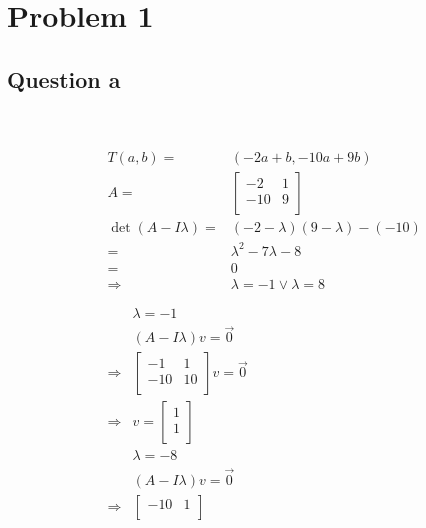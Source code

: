 \documentclass{article}
\begin{document}
\section{Problem 1}

\subsection{Question a}

~

\begin{equation*}
    \begin{split}
        &\begin{split}
            T(a,b)=&(-2a+b,-10a+9b)\\
            A=&\begin{bmatrix}
                -2&1\\
                -10&9\\
            \end{bmatrix}\\
            \det(A-I\lambda)=&(-2-\lambda)(9-\lambda)-(-10)\\
            =&\lambda^2-7\lambda-8\\
            =&0\\
            \Rightarrow&\lambda=-1\lor\lambda=8\\
        \end{split}\\
        &\begin{split}
            &\lambda=-1\\
            &(A-I\lambda)v=\overrightarrow{0}\\
            \Rightarrow&\begin{bmatrix}
                -1&1\\
                -10&10\\
            \end{bmatrix}v=\overrightarrow{0}\\
            \Rightarrow&v=\begin{bmatrix}
                1\\
                1\\
            \end{bmatrix}\\
            &\lambda=-8\\
            &(A-I\lambda)v=\overrightarrow{0}\\
            \Rightarrow&\begin{bmatrix}
                -10&1\\

\end{bmatrix}
\end{split}
\end{split}
\end{equation*}
\end{document}

